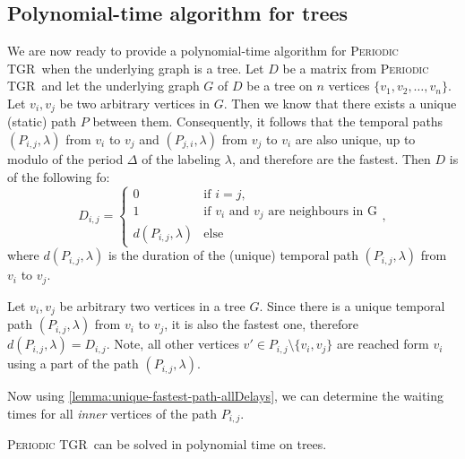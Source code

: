 \documentclass[a4paper,UKenglish,cleveref, autoref, thm-restate]{lipics-v2021}
\newcommand{\deltaExact}{\textsc{Periodic TGR}}
\begin{document}
\subsection{Polynomial-time algorithm for trees}\label{sec:treealgo}
We are now ready to provide a polynomial-time algorithm for \deltaExact\ when the underlying graph is a tree.
Let $D$ be a matrix from \deltaExact\ and let the underlying graph $G$ of $D$ be a tree on $n$ vertices $\{v_1, v_2, \dots, v_n\}$.
Let $v_i,v_j$ be two arbitrary vertices in $G$. Then we know that there exists a unique (static) path $P$ between them.
Consequently, it follows that the temporal paths $(P_{i,j},\lambda)$ from $v_i$ to $v_j$ and $(P_{j,i},\lambda)$ from $v_j$ to $v_i$ are also unique, up to modulo of the period $\Delta$ of the labeling $\lambda$,
and therefore are the fastest.
Then $D$ is of the following fo\rm:
\begin{equation*}
    D_{i,j} =
    \begin{cases}
    0 & \text{if $i = j$}, \\
    1 & \text{if $v_i$ and $v_j$ are neighbours in G}\\
    d(P_{i,j},\lambda) & \text{else}
    \end{cases},
\end{equation*}
where $d(P_{i,j},\lambda)$ is the duration of the (unique) temporal path $(P_{i,j},\lambda)$ from $v_i$ to $v_j$.

\begin{observation}\label{obs:travel-delays-in-trees}
    Let $v_i,v_j$  be arbitrary two vertices in a tree $G$. 
    Since there is a unique temporal path $(P_{i,j},\lambda)$ from $v_i$ to $v_j$, it is also the fastest one, therefore $d(P_{i,j},\lambda) = D_{i,j}$. 
    Note, all other vertices $v' \in P_{i,j} \setminus \{v_i,v_j\}$ are reached form $v_i$ using a part of the path $(P_{i,j},\lambda)$.
\end{observation}

Now using \cref{lemma:unique-fastest-path-allDelays}, we can determine the waiting times for all \emph{inner} vertices of the path $P_{i,j}$.

\begin{theorem} \label{thm:deltaExact-PolyTimeTrees}
    \deltaExact\ can be solved in polynomial time on trees.
\end{theorem}
\end{document}
